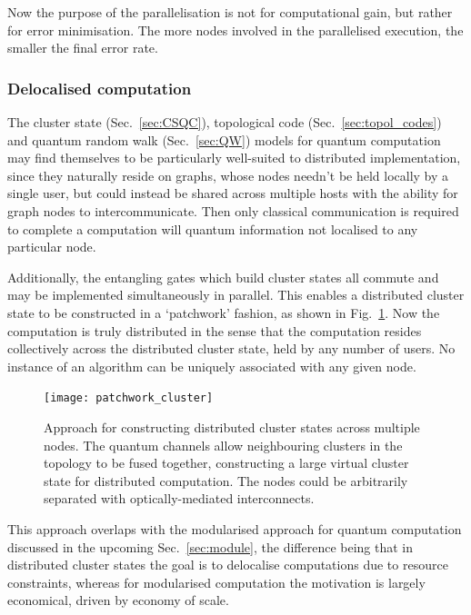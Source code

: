 Now the purpose of the parallelisation is not for computational gain, but rather for error minimisation. The more nodes involved in the parallelised execution, the smaller the final error rate.

\subsubsection{Delocalised computation}

The cluster state (Sec.~\ref{sec:CSQC}), topological code (Sec.~\ref{sec:topol_codes}) and quantum random walk (Sec.~\ref{sec:QW}) models for quantum computation may find themselves to be particularly well-suited to distributed implementation, since they naturally reside on graphs, whose nodes needn't be held locally by a single user, but could instead be shared across multiple hosts with the ability for graph nodes to intercommunicate. Then only classical communication is required to complete a computation will quantum information not localised to any particular node.

Additionally, the entangling gates which build cluster states all commute and may be implemented simultaneously in parallel. This enables a distributed cluster state to be constructed in a `patchwork' fashion, as shown in Fig.~\ref{fig:patchwork_cluster}. Now the computation is truly distributed in the sense that the computation resides collectively across the distributed cluster state, held by any number of users. No instance of an algorithm can be uniquely associated with any given node.

\begin{figure}[htpb]
\texttt{[image: patchwork\_cluster]} 
\caption{Approach for constructing distributed cluster states across multiple nodes. The quantum channels allow neighbouring clusters in the topology to be fused together, constructing a large virtual cluster state for distributed computation. The nodes could be arbitrarily separated with optically-mediated interconnects.} \label{fig:patchwork_cluster}
\end{figure}

This approach overlaps with the modularised approach for quantum computation discussed in the upcoming Sec.~\ref{sec:module}, the difference being that in distributed cluster states the goal is to delocalise computations due to resource constraints, whereas for modularised computation the motivation is largely economical, driven by economy of scale.

